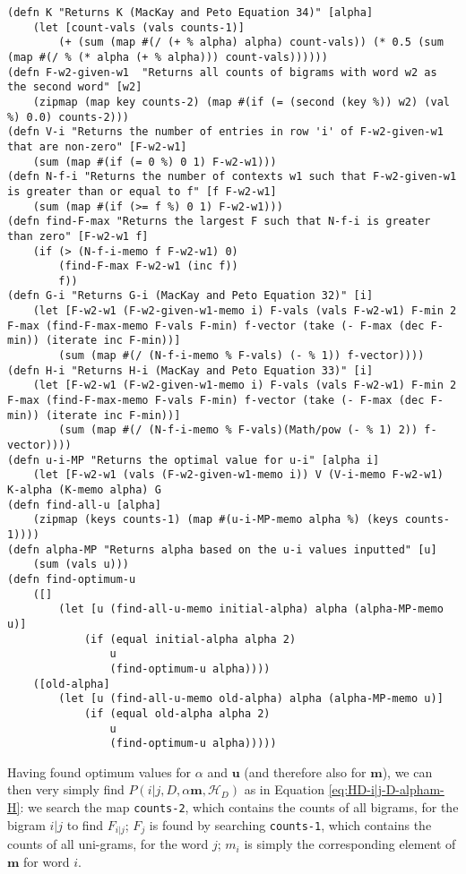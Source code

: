 \begin{lstlisting}
(defn K "Returns K (MacKay and Peto Equation 34)" [alpha] 
	(let [count-vals (vals counts-1)] 
		(+ (sum (map #(/ (+ % alpha) alpha) count-vals)) (* 0.5 (sum (map #(/ % (* alpha (+ % alpha))) count-vals))))))
(defn F-w2-given-w1  "Returns all counts of bigrams with word w2 as the second word" [w2] 
	(zipmap (map key counts-2) (map #(if (= (second (key %)) w2) (val %) 0.0) counts-2)))
(defn V-i "Returns the number of entries in row 'i' of F-w2-given-w1 that are non-zero" [F-w2-w1] 
	(sum (map #(if (= 0 %) 0 1) F-w2-w1)))
(defn N-f-i "Returns the number of contexts w1 such that F-w2-given-w1 is greater than or equal to f" [f F-w2-w1] 
	(sum (map #(if (>= f %) 0 1) F-w2-w1)))
(defn find-F-max "Returns the largest F such that N-f-i is greater than zero" [F-w2-w1 f] 
	(if (> (N-f-i-memo f F-w2-w1) 0) 
		(find-F-max F-w2-w1 (inc f)) 
		f))
(defn G-i "Returns G-i (MacKay and Peto Equation 32)" [i] 
	(let [F-w2-w1 (F-w2-given-w1-memo i) F-vals (vals F-w2-w1) F-min 2 F-max (find-F-max-memo F-vals F-min) f-vector (take (- F-max (dec F-min)) (iterate inc F-min))] 
		(sum (map #(/ (N-f-i-memo % F-vals) (- % 1)) f-vector))))
(defn H-i "Returns H-i (MacKay and Peto Equation 33)" [i] 
	(let [F-w2-w1 (F-w2-given-w1-memo i) F-vals (vals F-w2-w1) F-min 2 F-max (find-F-max-memo F-vals F-min) f-vector (take (- F-max (dec F-min)) (iterate inc F-min))] 
		(sum (map #(/ (N-f-i-memo % F-vals)(Math/pow (- % 1) 2)) f-vector))))
(defn u-i-MP "Returns the optimal value for u-i" [alpha i] 
	(let [F-w2-w1 (vals (F-w2-given-w1-memo i)) V (V-i-memo F-w2-w1) K-alpha (K-memo alpha) G 
(defn find-all-u [alpha] 
	(zipmap (keys counts-1) (map #(u-i-MP-memo alpha %) (keys counts-1))))
(defn alpha-MP "Returns alpha based on the u-i values inputted" [u] 
	(sum (vals u)))
(defn find-optimum-u 
	([] 
		(let [u (find-all-u-memo initial-alpha) alpha (alpha-MP-memo u)] 
			(if (equal initial-alpha alpha 2) 
				u 
				(find-optimum-u alpha)))) 
	([old-alpha] 
		(let [u (find-all-u-memo old-alpha) alpha (alpha-MP-memo u)] 
			(if (equal old-alpha alpha 2) 
				u 
				(find-optimum-u alpha)))))
\end{lstlisting}

Having found optimum values for $\alpha$ and $\boldsymbol{u}$ (and therefore also for $\boldsymbol{m}$), we can then very simply find $P(i|j,D,\alpha\boldsymbol{m},\mathscr{H}_{D})$ as in Equation \ref{eq:HD-i|j-D-alpham-H}: we search the map \lstinline!counts-2!, which contains the counts of all bigrams, for the bigram $i|j$ to find $F_{i|j}$; $F_{j}$ is found by searching \lstinline!counts-1!, which contains the counts of all uni-grams, for the word $j$; $m_{i}$ is simply the corresponding element of $\boldsymbol{m}$ for word $i$.


